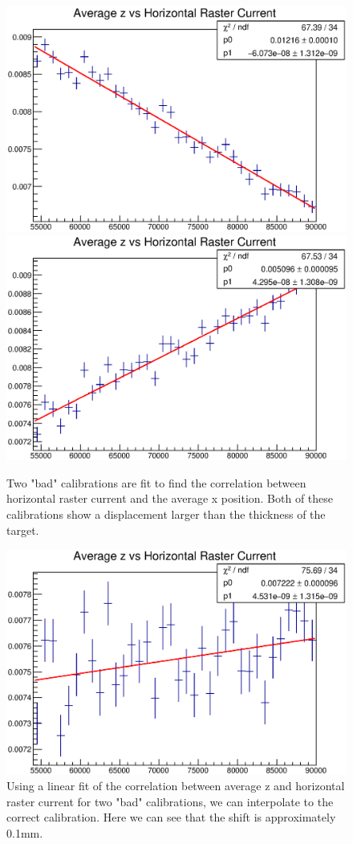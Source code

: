 \begin{figure}
	\includegraphics[width=\textwidth]{./analysis/fig/old1_avgz.eps}
	\includegraphics[width=\textwidth]{./analysis/fig/old2_avgz.eps}
	\caption{Two "bad" calibrations are fit to find the correlation between horizontal raster current and the average x position. Both of these calibrations show a displacement larger than the thickness of the target.}
\end{figure}
\begin{figure}
	\includegraphics[width=\textwidth]{./analysis/fig/final_avgz.eps}
	\caption{Using a linear fit of the correlation between average z and horizontal raster current for two "bad" calibrations, we can interpolate to the correct calibration. Here we can see that the shift is approximately 0.1mm.}
\end{figure}

